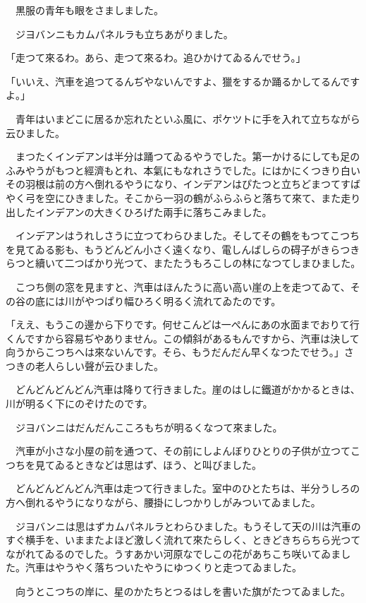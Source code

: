 \documentclass[tate,paper=b6j,jafontsize=9pt]{jlreq}
\begin{document}
　黒服の青年も眼をさましました。

　ジヨバンニもカムパネルラも立ちあがりました。

「走つて來るわ。あら、走つて來るわ。追ひかけてゐるんでせう。」

「いいえ、汽車を追つてるんぢやないんですよ、獵をするか踊るかしてるんですよ。」

　青年はいまどこに居るか忘れたといふ風に、ポケツトに手を入れて立ちながら云ひました。

　まつたくインデアンは半分は踊つてゐるやうでした。第一かけるにしても足のふみやうがもつと經濟もとれ、本氣にもなれさうでした。にはかにくつきり白いその羽根は前の方へ倒れるやうになり、インデアンはぴたつと立ちどまつてすばやく弓を空にひきました。そこから一羽の鶴がふらふらと落ちて來て、また走り出したインデアンの大きくひろげた兩手に落ちこみました。

　インデアンはうれしさうに立つてわらひました。そしてその鶴をもつてこつちを見てゐる影も、もうどんどん小さく遠くなり、電しんばしらの碍子がきらつきらつと續いて二つばかり光つて、またたうもろこしの林になつてしまひました。

　こつち側の窓を見ますと、汽車はほんたうに高い高い崖の上を走つてゐて、その谷の底には川がやつぱり幅ひろく明るく流れてゐたのです。

「ええ、もうこの邊から下りです。何せこんどは一ぺんにあの水面までおりて行くんですから容易ぢやありません。この傾斜があるもんですから、汽車は決して向うからこつちへは來ないんです。そら、もうだんだん早くなつたでせう。」さつきの老人らしい聲が云ひました。

　どんどんどんどん汽車は降りて行きました。崖のはしに鐵道がかかるときは、川が明るく下にのぞけたのです。

　ジヨバンニはだんだんこころもちが明るくなつて來ました。

　汽車が小さな小屋の前を通つて、その前にしよんぼりひとりの子供が立つてこつちを見てゐるときなどは思はず、ほう、と叫びました。

　どんどんどんどん汽車は走つて行きました。室中のひとたちは、半分うしろの方へ倒れるやうになりながら、腰掛にしつかりしがみついてゐました。

　ジヨバンニは思はずカムパネルラとわらひました。もうそして天の川は汽車のすぐ横手を、いままたよほど激しく流れて來たらしく、ときどきちらちら光つてながれてゐるのでした。うすあかい河原なでしこの花があちこち咲いてゐました。汽車はやうやく落ちついたやうにゆつくりと走つてゐました。

　向うとこつちの岸に、星のかたちとつるはしを書いた旗がたつてゐました。
\end{document}

